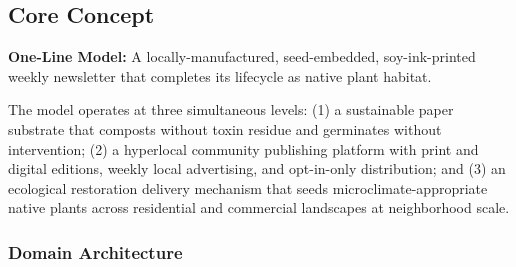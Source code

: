 \documentclass[11pt,letterpaper]{article}
\begin{document}
\subsection{Core Concept}

\textbf{One-Line Model:} A locally-manufactured, seed-embedded, soy-ink-printed weekly newsletter that completes its lifecycle as native plant habitat.

The model operates at three simultaneous levels: (1) a sustainable paper substrate that composts without toxin residue and germinates without intervention; (2) a hyperlocal community publishing platform with print and digital editions, weekly local advertising, and opt-in-only distribution; and (3) an ecological restoration delivery mechanism that seeds microclimate-appropriate native plants across residential and commercial landscapes at neighborhood scale.

\subsubsection{Domain Architecture}
\end{document}
